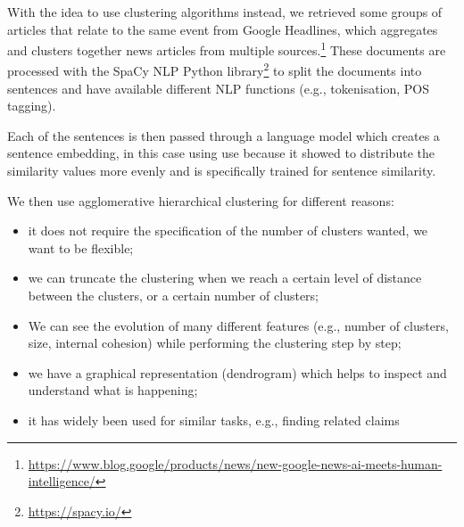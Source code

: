 With the idea to use clustering algorithms instead, we retrieved some groups of articles that relate to the same event from Google Headlines, which aggregates and clusters together news articles from multiple sources.\footnote{\url{https://www.blog.google/products/news/new-google-news-ai-meets-human-intelligence/}}
These documents are processed with the SpaCy NLP Python library\footnote{\url{https://spacy.io/}} to split the documents into sentences and have available different NLP functions (e.g., tokenisation, POS tagging).

Each of the sentences is then passed through a language model which creates a sentence embedding, in this case using \acrshort{use} because it showed to distribute the similarity values more evenly and is specifically trained for sentence similarity.

We then use agglomerative hierarchical clustering for different reasons:
\begin{itemize}
    \item it does not require the specification of the number of clusters wanted, we want to be flexible;
    \item we can truncate the clustering when we reach a certain level of distance between the clusters, or a certain number of clusters;
    \item We can see the evolution of many different features (e.g., number of clusters, size, internal cohesion) while performing the clustering step by step;
    \item we have a graphical representation (dendrogram) which helps to inspect and understand what is happening;
    \item it has widely been used for similar tasks, e.g., finding related claims~\citep{almeida2020text}
\end{itemize}


